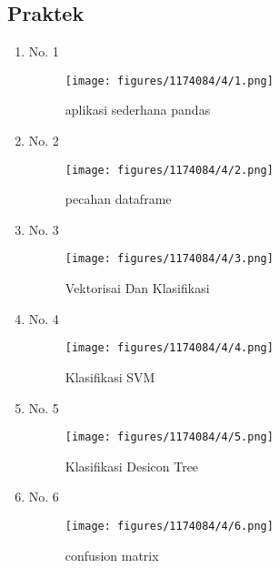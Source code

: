 \subsection{Praktek}
\begin{enumerate}
\item No. 1
	\hfill\\
	
\begin{figure}[H]
    \texttt{[image: figures/1174084/4/1.png]}
    \centering
    \caption{aplikasi sederhana pandas}
\end{figure}

\item No. 2
	\hfill\\
	
\begin{figure}[H]
    \texttt{[image: figures/1174084/4/2.png]}
    \centering
    \caption{pecahan dataframe}
\end{figure}

\item No. 3
	\hfill\\
	
\begin{figure}[H]
    \texttt{[image: figures/1174084/4/3.png]}
    \centering
    \caption{Vektorisai Dan Klasifikasi}
\end{figure}

\item No. 4
	\hfill\\
	
\begin{figure}[H]
    \texttt{[image: figures/1174084/4/4.png]}
    \centering
    \caption{Klasifikasi SVM}
\end{figure}

\item No. 5
	\hfill\\
	
\begin{figure}[H]
    \texttt{[image: figures/1174084/4/5.png]}
    \centering
    \caption{Klasifikasi Desicon Tree}
\end{figure}

\item No. 6
	\hfill\\
	
\begin{figure}[H]
    \texttt{[image: figures/1174084/4/6.png]}
    \centering
    \caption{confusion matrix}
\end{figure}


\end{enumerate}
